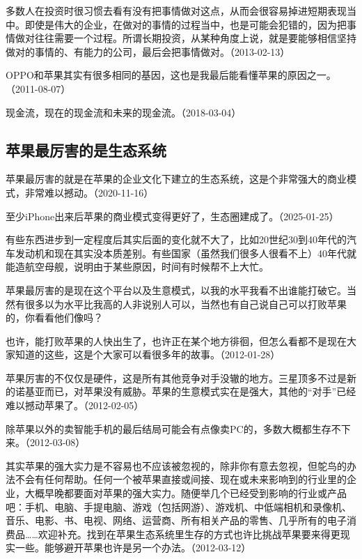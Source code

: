 多数人在投资时很习惯去看有没有把事情做对这点，从而会很容易掉进短期表现当中。即使是伟大的企业，在做对的事情的过程当中，也是可能会犯错的，因为把事情做对往往需要一个过程。所谓长期投资，从某种角度上说，就是要能够相信坚持做对的事情的、有能力的公司，最后会把事情做对。（2013-02-13）

OPPO和苹果其实有很多相同的基因，这也是我最后能看懂苹果的原因之一。（2011-08-07）


现金流，现在的现金流和未来的现金流。（2018-03-04）

\subsection{苹果最厉害的是生态系统}

苹果最厉害的就是在苹果的企业文化下建立的生态系统，这是个非常强大的商业模式，非常难以撼动。（2020-11-16）


至少iPhone出来后苹果的商业模式变得更好了，生态圈建成了。（2025-01-25）

有些东西进步到一定程度后其实后面的变化就不大了，比如20世纪30到40年代的汽车发动机和现在其实没本质差别。有些国家（虽然我们很多人很看不上）40年代就能造航空母舰，说明由于某些原因，时间有时候帮不上大忙。

苹果最厉害的是现在这个平台以及生意模式，以我的水平我看不出谁能打破它。当然有很多以为水平比我高的人非说别人可以，当然也有自己说自己可以打败苹果的，你看看他们像吗？

也许，能打败苹果的人快出生了，也许正在某个地方徘徊，但怎么看都不是现在大家知道的这些，这是个大家可以看很多年的故事。（2012-01-28）

苹果厉害的不仅仅是硬件，这是所有其他竞争对手没辙的地方。三星顶多不过是新的诺基亚而已，对苹果没有威胁。苹果的生意模式实在是强大，其他的“对手”已经难以撼动苹果了。（2012-02-05）

除苹果以外的卖智能手机的最后结局可能会有点像卖PC的，多数大概都生存不下来。（2012-03-08）

其实苹果的强大实力是不容易也不应该被忽视的，除非你有意去忽视，但鸵鸟的办法不会有任何帮助。任何一个被苹果直接或间接、现在或未来影响到的行业里的企业，大概早晚都要面对苹果的强大实力。随便举几个已经受到影响的行业或产品吧：手机、电脑、手提电脑、游戏（包括网游）、游戏机、中低端相机和录像机、音乐、电影、书、电视、网络、运营商、所有相关产品的零售、几乎所有的电子消费品……欢迎补充。找到在苹果生态系统里生存的方式也许比挑战苹果要来得更现实一些。能够避开苹果也许是另一个办法。（2012-03-12）

